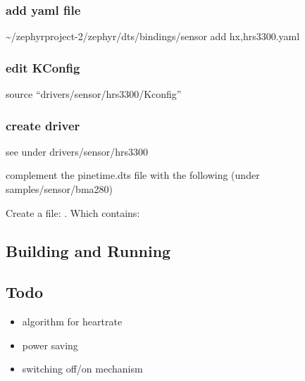 \documentclass[letterpaper,10pt,english]{sphinxmanual}
\begin{document}
\subsubsection{add yaml file}
\label{\detokenize{drivers/hrs3300:add-yaml-file}}
\textasciitilde{}/zephyrproject-2/zephyr/dts/bindings/sensor
add  hx,hrs3300.yaml


\subsubsection{edit KConfig}
\label{\detokenize{drivers/hrs3300:edit-kconfig}}
source “drivers/sensor/hrs3300/Kconfig”


\subsubsection{create driver}
\label{\detokenize{drivers/hrs3300:create-driver}}
see under drivers/sensor/hrs3300

complement the pinetime.dts file with the following (under samples/sensor/bma280)

\begin{sphinxVerbatim}[commandchars=\\\{\}]
\end{sphinxVerbatim}

Create a file: .
Which contains:

\begin{sphinxVerbatim}[commandchars=\\\{\}]
 
\end{sphinxVerbatim}


\subsection{Building and Running}
\label{\detokenize{drivers/hrs3300:building-and-running}}

\subsection{Todo}
\label{\detokenize{drivers/hrs3300:todo}}\begin{itemize}
\item {} 
algorithm for heartrate

\item {} 
power saving

\item {} 
switching off/on mechanism

\end{itemize}
\end{document}
